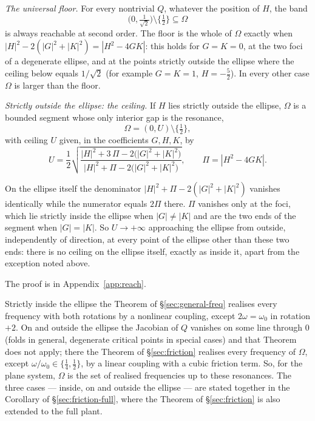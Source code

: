 \documentclass[11pt,reqno]{amsart}
\theoremstyle{plain}
\theoremstyle{definition}
\theoremstyle{remark}
\begin{document}
\emph{The universal floor.} For every nontrivial $Q$, whatever the position of $H$, the band
\begin{equation}\label{eq:floor}
  \bigl(0,\tfrac1{\sqrt2}\bigr)\setminus\{\tfrac12\}\subseteq\Omega
\end{equation}
is always reachable at second order. The floor is the whole of $\Omega$ exactly when
$|H|^{2}-2(|G|^{2}+|K|^{2})=|H^{2}-4GK|$: this holds for $G=K=0$, at the two foci of a degenerate
ellipse, and at the points strictly outside the ellipse where the ceiling below equals
$1/\sqrt2$ (for example $G=K=1$, $H=-\tfrac52$). In every other case $\Omega$ is larger than the floor.

\emph{Strictly outside the ellipse: the ceiling.} If $H$ lies strictly outside the ellipse,
$\Omega$ is a
bounded segment whose only interior gap is the resonance,
\begin{equation}\label{eq:segment}
  \Omega=(0,U)\setminus\{\tfrac12\},
\end{equation}
with ceiling $U$ given, in the coefficients $G,H,K$, by
\begin{equation}\label{eq:ceiling-U}
  U=\frac12\sqrt{\frac{|H|^{2}+3\,\Pi-2\bigl(|G|^{2}+|K|^{2}\bigr)}{|H|^{2}+\Pi-2\bigl(|G|^{2}+|K|^{2}\bigr)}},
  \qquad \Pi=|H^{2}-4GK|.
\end{equation}

On the ellipse itself the denominator $|H|^{2}+\Pi-2(|G|^{2}+|K|^{2})$ vanishes identically while
the numerator equals $2\Pi$ there. $\Pi$ vanishes only at the foci, which lie strictly inside the
ellipse when $|G|\neq|K|$ and are the two ends of the segment when $|G|=|K|$. So $U\to+\infty$
approaching the ellipse from outside, independently of direction, at every point of the ellipse
other than these two ends: there is no ceiling on the ellipse itself, exactly as inside it, apart
from the exception noted above.

The proof is in Appendix~\ref{app:reach}.

Strictly inside the ellipse the Theorem of \S\ref{sec:general-freq} realises every frequency
with both rotations by a nonlinear coupling, except $2\omega=\omega_0$ in rotation $+2$. On and outside the ellipse the Jacobian of $Q$ vanishes on some line through $0$
(folds in general, degenerate critical points in special cases) and that Theorem does not apply; there the Theorem of \S\ref{sec:friction} realises every frequency of $\Omega$, except
$\omega/\omega_0\in\{\frac14,\frac12\}$, by a linear coupling with a cubic friction term.
So, for the plane system, $\Omega$ is the set of realised frequencies up to these resonances. The three
cases --- inside, on and outside the ellipse --- are stated together in the Corollary of \S\ref{sec:friction-full},
where the Theorem of \S\ref{sec:friction} is also extended to the full plant.
\end{document}

